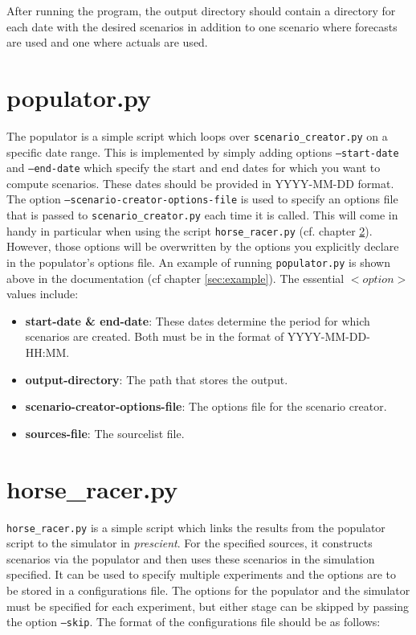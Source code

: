 \documentclass[11pt]{article}
\begin{document}
After running the program, the output directory should contain a directory for each date with the desired scenarios in addition to one scenario where forecasts are used and one where actuals are used.

\section{populator.py}

The populator is a simple script which loops over \texttt{scenario\_creator.py} on a specific date range. This is implemented by simply adding options \texttt{--start-date} and \texttt{--end-date} which specify the start and end dates for which you want to compute scenarios. These dates should be provided in YYYY-MM-DD format.
 The option \texttt{--scenario-creator-options-file} is used to specify an options file that is passed to \texttt{scenario\_creator.py} each time it is called. This will come in handy in particular when using the script \texttt{horse\_racer.py} (cf. chapter \ref{sec:horse_racer}). However, those options will be overwritten by the options you explicitly declare in the populator's options file. An example of running \texttt{populator.py} is shown above in the documentation (cf chapter \ref{sec:example}). The essential $<option>$ values include: 
 
 \begin{itemize}
	\item \textbf{start-date \& end-date}: These dates determine the period for which scenarios are created. Both must be in the format of YYYY-MM-DD-HH:MM.
	\item \textbf{output-directory}: The path that stores the output.
	\item \textbf{scenario-creator-options-file}: The options file for the scenario creator.
	\item \textbf{sources-file}: The sourcelist file.
\end{itemize}


\section{horse\_racer.py}\label{sec:horse_racer}

\texttt{horse\_racer.py} is a simple script which links the results from the populator script to the simulator in \textit{prescient}. For the specified sources, it constructs scenarios via
the populator and then uses these scenarios in the simulation specified.
It can be used to specify multiple experiments and the options are to be stored in a configurations file. The options for the populator and the simulator must be specified for each experiment, but either stage can be skipped by passing the option \texttt{--skip}. The format of the configurations file should be as follows:
\end{document}
